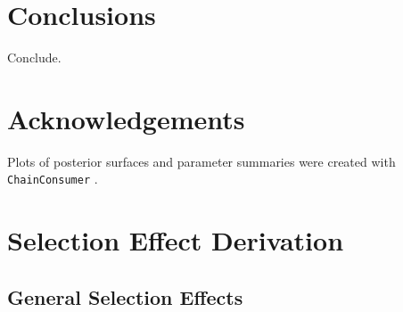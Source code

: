 \documentclass[a4paper,fleqn,usenatbib]{mnras}
\begin{document}
\section{Conclusions}

Conclude.



\section*{Acknowledgements}

Plots of posterior surfaces and parameter summaries were created with \verb|ChainConsumer| \citep{Hinton2016}.












\appendix

\section{Selection Effect Derivation}
\label{app:selection}

\subsection{General Selection Effects}
\end{document}
